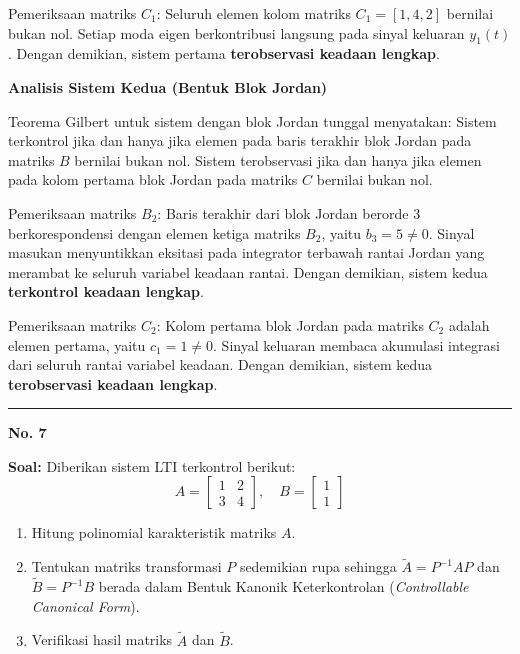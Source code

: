 \documentclass[11pt,a4paper]{article}
\begin{document}
Pemeriksaan matriks $C_1$:
Seluruh elemen kolom matriks $C_1 = [1, 4, 2]$ bernilai bukan nol. Setiap moda eigen berkontribusi langsung pada sinyal keluaran $y_1(t)$. Dengan demikian, sistem pertama \textbf{terobservasi keadaan lengkap}.

\textbf{Analisis Sistem Kedua (Bentuk Blok Jordan)}

Teorema Gilbert untuk sistem dengan blok Jordan tunggal menyatakan:
Sistem terkontrol jika dan hanya jika elemen pada baris terakhir blok Jordan pada matriks $B$ bernilai bukan nol.
Sistem terobservasi jika dan hanya jika elemen pada kolom pertama blok Jordan pada matriks $C$ bernilai bukan nol.

Pemeriksaan matriks $B_2$:
Baris terakhir dari blok Jordan berorde 3 berkorespondensi dengan elemen ketiga matriks $B_2$, yaitu $b_3 = 5 \ne 0$. Sinyal masukan menyuntikkan eksitasi pada integrator terbawah rantai Jordan yang merambat ke seluruh variabel keadaan rantai. Dengan demikian, sistem kedua \textbf{terkontrol keadaan lengkap}.

Pemeriksaan matriks $C_2$:
Kolom pertama blok Jordan pada matriks $C_2$ adalah elemen pertama, yaitu $c_1 = 1 \ne 0$. Sinyal keluaran membaca akumulasi integrasi dari seluruh rantai variabel keadaan. Dengan demikian, sistem kedua \textbf{terobservasi keadaan lengkap}.

\vspace{12pt}
\hrule
\vspace{10pt}

\textbf{\large No. 7}

\textbf{Soal:}  
Diberikan sistem LTI terkontrol berikut:
$$A = \begin{bmatrix} 1 & 2 \\ 3 & 4 \end{bmatrix}, \quad B = \begin{bmatrix} 1 \\ 1 \end{bmatrix}$$
\begin{enumerate}[label=(\alph*)]
    \item Hitung polinomial karakteristik matriks $A$.
    \item Tentukan matriks transformasi $P$ sedemikian rupa sehingga $\tilde{A} = P^{-1} A P$ dan $\tilde{B} = P^{-1} B$ berada dalam Bentuk Kanonik Keterkontrolan (\textit{Controllable Canonical Form}).
    \item Verifikasi hasil matriks $\tilde{A}$ dan $\tilde{B}$.
\end{enumerate}
\end{document}
